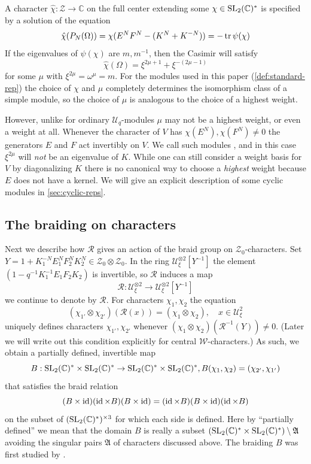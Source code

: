 \documentclass{sl2ams}
\numberwithin{equation}{section}
\newcommand{\CC}{\mathbb{C}}
\newcommand{\Z}{\mathcal{Z}}
\newcommand{\U}{\mathcal{U}}
\newcommand{\W}{\mathcal{W}}
\newcommand{\R}{\mathcal{R}}
\begin{document}
A character \(\hat \chi : \Z \to \CC\) on the full center extending some \(\chi \in \operatorname{SL}_2(\mathbb{C})^*\) is specified by a solution of the equation
\[
  \hat \chi(P_N(\Omega)) = \chi(E^N F^N - (K^N + K^{-N}))
  =
  - \operatorname{tr} \psi(\chi)
\]
If the eigenvalues of \(\psi(\chi)\) are \(m, m^{-1}\), then the Casimir will satisfy
\[
  \hat \chi(\Omega) = \xi^{2\mu + 1} + \xi^{-(2\mu-1)}
\]
for some \(\mu\) with \(\xi^{2\mu} =\omega^{\mu} = m\).
For the modules used in this paper (\cref{def:standard-rep}) the choice of \(\chi\) and \(\mu\) completely determines the isomorphism class of a simple module, so the choice of \(\mu\) is analogous to the choice of a highest weight.

However, unlike for ordinary \(\U_q\)-modules \(\mu\) may not be a highest weight, or even a weight at all.
Whenever the character of \(V\) has \(\chi(E^N), \chi(F^N) \ne 0\)  the generators  \(E\) and \(F\) act invertibly on \(V\).
We call such modules  , and in this case \(\xi^{2\mu}\)  will \emph{not} be an eigenvalue of \(K\).
While one can still consider a weight basis for \(V\) by diagonalizing \(K\) there is no canonical way to choose a \emph{highest} weight because \(E\) does not have a kernel.
We will give an explicit description of some cyclic modules in \cref{sec:cyclic-reps}.

\subsection{The braiding on characters}
\label{sec:braiding root of unity}
Next we describe how \(\R\) gives an action of the braid group on \(\Z_{0}\)-characters.
Set \(Y = 1 + K_1^{-N} E_1^N F_2^N K_2^N \in \Z_0 \otimes \Z_0\).
In the ring \(\U_\xi^{\otimes 2}[Y^{-1}]\) the element \((1 - q^{-1} K_1^{-1} E_1 F_2 K_2)\) is invertible, so \(\R\) induces a map
\[
  \R :
  \U_\xi^{\otimes 2}
  \to
  \U_\xi^{\otimes 2}[Y^{-1}]
\]
we continue to denote by \(\R\).
For characters \(\chi_1, \chi_2\) the equation
\[
  (\chi_{1'} \otimes \chi_{2'}) (\R (x)) = (\chi_1 \otimes \chi_2), \quad x \in \U_\xi^{2}
\]
uniquely defines characters \(\chi_{1'}, \chi_{2'}\) whenever \((\chi_1 \otimes \chi_2)(\R^{-1}(Y)) \ne 0\).
(Later we will write out this condition explicitly for central \(\W\)-characters.)
As such, we obtain a partially defined, invertible map
\[
  B : \operatorname{SL}_2(\mathbb{C})^* \times \operatorname{SL}_2(\mathbb{C})^*  \to \operatorname{SL}_2(\mathbb{C})^* \times \operatorname{SL}_2(\mathbb{C})^*
  ,
  B(\chi_1, \chi_2) = (\chi_{2'}, \chi_{1'})
\]
that satisfies the braid relation
\[
  (B \times \operatorname{id})
  (\operatorname{id} \times B )
  (B \times \operatorname{id})
  =
  (\operatorname{id} \times B )
  (B \times \operatorname{id})
  (\operatorname{id} \times B )
\]
on the subset of \((\operatorname{SL}_2(\mathbb{C})^*)^{\times 3}\) for which each side is defined.
Here by ``partially defined'' we mean that the domain \(B\) is really a subset  \( (\operatorname{SL}_2(\mathbb{C})^* \times \operatorname{SL}_2(\mathbb{C})^*) \setminus \mathfrak{A}\) avoiding the singular pairs \(\mathfrak{A}\) of characters discussed above.
The braiding \(B\) was first studied by \textcite{Weinstein1992}.
\end{document}
